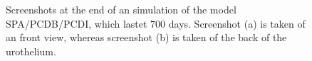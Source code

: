 \begin{figure}[ht]
\begin{center}
\end{center}
\begin{center}
\end{center}
\caption[Simulated urothel with the model SPA/PCDB/PCDI at day 700]{\label{img:720daysScreenshotSPA/BCPD/IPCD}Screenshots at the end of an simulation of the model SPA/PCDB/PCDI, which lastet 700 days. Screenshot (a) is taken of an front view, whereas screenshot (b) is taken of the back of the urothelium.}

\end{figure}



